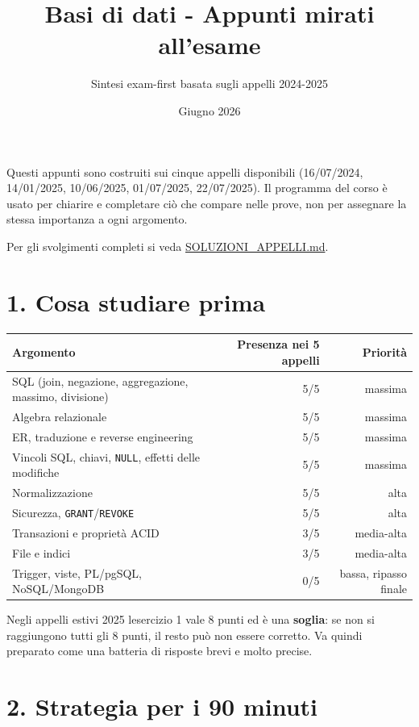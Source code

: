 \documentclass[
  10pt,
  a4paper,
]{article}
\title{Basi di dati - Appunti mirati all'esame}
\subtitle{Sintesi exam-first basata sugli appelli 2024-2025}
\author{}
\date{Giugno 2026}
\newcounter{none} %
\begin{document}
\maketitle

{
\setcounter{tocdepth}{2}
\tableofcontents
}
Questi appunti sono costruiti sui cinque appelli disponibili
(16/07/2024, 14/01/2025, 10/06/2025, 01/07/2025, 22/07/2025). Il
programma del corso è usato per chiarire e completare ciò che compare
nelle prove, non per assegnare la stessa importanza a ogni argomento.

Per gli svolgimenti completi si veda \url{SOLUZIONI_APPELLI.md}.

\section{1. Cosa studiare prima}\label{1-cosa-studiare-prima}

{\def\LTcaptype{none} %
\begin{longtable}[]{@{}lrr@{}}
\toprule\noalign{}
Argomento & Presenza nei 5 appelli & Priorità \\
\midrule\noalign{}
\endhead
\bottomrule\noalign{}
\endlastfoot
SQL (join, negazione, aggregazione, massimo, divisione) & 5/5 &
massima \\
Algebra relazionale & 5/5 & massima \\
ER, traduzione e reverse engineering & 5/5 & massima \\
Vincoli SQL, chiavi, \texttt{NULL}, effetti delle modifiche & 5/5 &
massima \\
Normalizzazione & 5/5 & alta \\
Sicurezza, \texttt{GRANT}/\texttt{REVOKE} & 5/5 & alta \\
Transazioni e proprietà ACID & 3/5 & media-alta \\
File e indici & 3/5 & media-alta \\
Trigger, viste, PL/pgSQL, NoSQL/MongoDB & 0/5 & bassa, ripasso finale \\
\end{longtable}
}

Negli appelli estivi 2025 l\textquotesingle esercizio 1 vale 8 punti ed
è una \textbf{soglia}: se non si raggiungono tutti gli 8 punti, il resto
può non essere corretto. Va quindi preparato come una batteria di
risposte brevi e molto precise.

\section{2. Strategia per i 90
minuti}\label{2-strategia-per-i-90-minuti}
\end{document}
